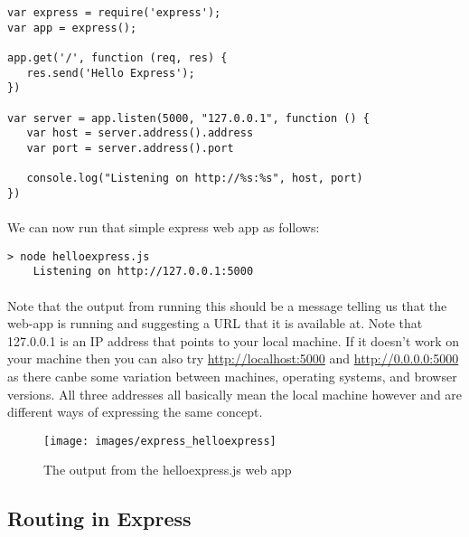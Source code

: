 \documentclass[10pt, a4paper, twosize]{article}
\begin{document}
\begin{lstlisting}
var express = require('express');
var app = express();

app.get('/', function (req, res) {
   res.send('Hello Express');
})

var server = app.listen(5000, "127.0.0.1", function () {
   var host = server.address().address
   var port = server.address().port
   
   console.log("Listening on http://%s:%s", host, port)
})
\end{lstlisting}

\paragraph{}

\paragraph{} We can now run that simple express web app as follows:

\begin{lstlisting}[style=DOS]
    > node helloexpress.js
    Listening on http://127.0.0.1:5000
\end{lstlisting}

\paragraph{} Note that the output from running this should be a message telling us that the web-app is running and suggesting a URL that it is available at. Note that 127.0.0.1 is an IP address that points to your local machine. If it doesn't work on your machine then you can also try \url{http://localhost:5000} and \url{http://0.0.0.0:5000} as there canbe some variation between machines, operating systems, and browser versions. All three addresses all basically mean the local machine however and are different ways of expressing the same concept.

\begin{figure}[H]
\texttt{[image: images/express\_helloexpress]}
\caption{The output from the helloexpress.js web app}
\label{fig:express_helloexpress}
\end{figure}


\subsection{Routing in Express}
\end{document}
